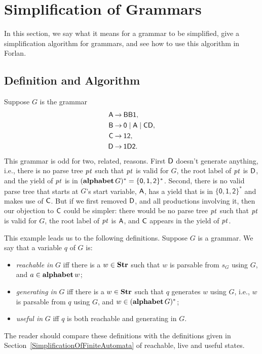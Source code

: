 \section{Simplification of Grammars}
\label{SimplificationOfGrammars}

%
%

In this section, we say what it means for a grammar to be simplified,
give a simplification algorithm for grammars, and see how to use this
algorithm in Forlan.

\subsection{Definition and Algorithm}

Suppose $G$ is the grammar
\begin{align*}
\mathsf{A} &\mathbin{\to} \mathsf{BB1}, \\
\mathsf{B} &\mathbin{\to} \mathsf{0}\mid\mathsf{A}\mid\mathsf{C}\mathsf{D}, \\
\mathsf{C} &\mathbin{\to} \mathsf{1}\mathsf{2} , \\
\mathsf{D} &\mathbin{\to} \mathsf{1}\mathsf{D}\mathsf{2} .
\end{align*}
This grammar is odd for two, related, reasons.  First
$\mathsf{D}$ doesn't generate anything, i.e., there is no parse
tree ${\it pt}$ such that ${\it pt}$ is valid for $G$, the root label of
${\it pt}$ is $\mathsf{D}$, and the yield of ${\it pt}$ is in $(\mathbf{alphabet}\,G)^* =
\{\mathsf{0,1,2}\}^*$.
Second, there is no valid parse tree that starts at $G$'s
start variable, $\mathsf{A}$, has a yield that is in $\{\mathsf{0,1,2}\}^*$
and makes use of $\mathsf{C}$.  But if we first removed $\mathsf{D}$, and all productions
involving it, then our objection to $\mathsf{C}$ could be simpler: there
would be no parse tree ${\it pt}$ such that ${\it pt}$ is valid for $G$,
the root label of ${\it pt}$ is $\mathsf{A}$, and $\mathsf{C}$ appears in the yield
of ${\it pt}$.

This example leads us to the following definitions.  Suppose $G$ is a
grammar.  We say that a variable $q$ of $G$ is:
%
%
%
\begin{itemize}
\item \emph{reachable in} $G$ iff there is a $w\in\mathbf{Str}$ such that
  $w$ is parsable from $s_G$ using $G$, and $a\in\mathbf{alphabet}\,w$;

\item \emph{generating in} $G$ iff there is a $w\in\mathbf{Str}$ such that $q$
  generates $w$ using $G$, i.e., $w$ is parsable from $q$ using $G$,
  and $w\in(\mathbf{alphabet}\,G)^*$;

\item \emph{useful in} $G$ iff $q$ is both reachable and
  generating in $G$.
\end{itemize}
The reader should compare these definitions with the definitions given
in Section~\ref{SimplificationOfFiniteAutomata} of reachable, live and
useful states.

